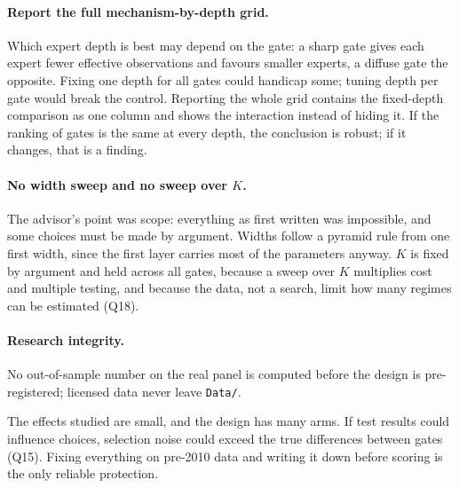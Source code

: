 \paragraph{Report the full mechanism-by-depth grid.} 

\begin{whybox}
Which expert depth is best may depend on the gate: a sharp gate gives each expert fewer effective
observations and favours smaller experts, a diffuse gate the opposite. Fixing one depth for all gates could
handicap some; tuning depth per gate would break the control. Reporting the whole grid contains the
fixed-depth comparison as one column and shows the interaction instead of hiding it. If the ranking of
gates is the same at every depth, the conclusion is robust; if it changes, that is a finding.
\end{whybox}

\paragraph{No width sweep and no sweep over $K$.} 

\begin{whybox}
The advisor's point was scope: everything as first written was impossible, and some choices must be
made by argument. Widths follow a pyramid rule from one first width, since the first layer carries most of
the parameters anyway. $K$ is fixed by argument and held across all gates, because a sweep over $K$
multiplies cost and multiple testing, and because the data, not a search, limit how many regimes can be
estimated (Q18).
\end{whybox}

\paragraph{Research integrity.} No out-of-sample number on the real panel is computed before the design
is pre-registered; licensed data never leave \texttt{Data/}.

\begin{whybox}
The effects studied are small, and the design has many arms. If test results could influence choices,
selection noise could exceed the true differences between gates (Q15). Fixing everything on pre-2010 data
and writing it down before scoring is the only reliable protection.
\end{whybox}

